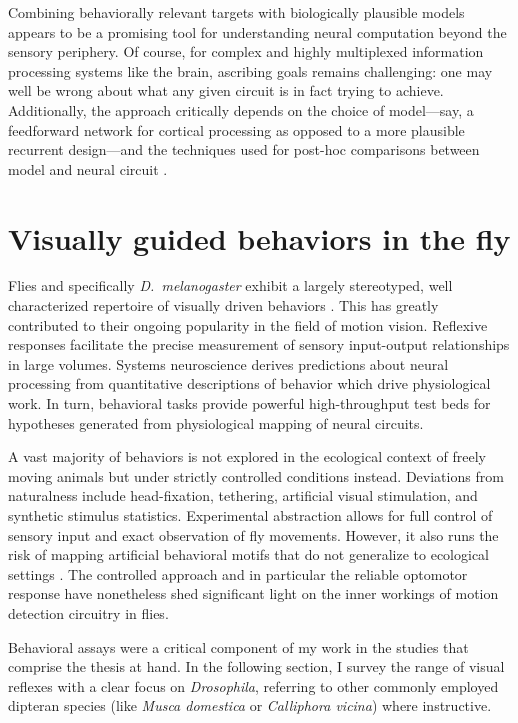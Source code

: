 Combining behaviorally relevant targets with biologically plausible models appears to be a promising tool for understanding neural computation beyond the sensory periphery. Of course, for complex and highly multiplexed information processing systems like the brain, ascribing goals remains challenging: one may well be wrong about what any given circuit is in fact trying to achieve. Additionally, the approach critically depends on the choice of model---say, a feedforward network for cortical processing as opposed to a more plausible recurrent design---and the techniques used for post-hoc comparisons between model and neural circuit \citep{Yamins:2016hg}.


\section{Visually guided behaviors in the fly}
Flies and specifically \textit{D.\ melanogaster} exhibit a largely stereotyped, well characterized repertoire of visually driven behaviors \citep{Borst:2014kl}. This has greatly contributed to their ongoing popularity in the field of motion vision. Reflexive responses facilitate the precise measurement of sensory input-output relationships in large volumes. Systems neuroscience derives predictions about neural processing from quantitative descriptions of behavior which drive physiological work. In turn, behavioral tasks provide powerful high-throughput test beds for hypotheses generated from physiological mapping of neural circuits.

A vast majority of behaviors is not explored in the ecological context of freely moving animals but under strictly controlled conditions instead. Deviations from naturalness include head-fixation, tethering, artificial visual stimulation, and synthetic stimulus statistics. Experimental abstraction allows for full control of sensory input and exact observation of fly movements. However, it also runs the risk of mapping artificial behavioral motifs that do not generalize to ecological settings \citep{Krakauer:2017aa}. The controlled approach and in particular the reliable optomotor response have nonetheless shed significant light on the inner workings of motion detection circuitry in flies.

Behavioral assays were a critical component of my work in the studies that comprise the thesis at hand. In the following section, I survey the range of visual reflexes with a clear focus on \textit{Drosophila}, referring to other commonly employed dipteran species (like \textit{Musca domestica} or \textit{Calliphora vicina}) where instructive.

